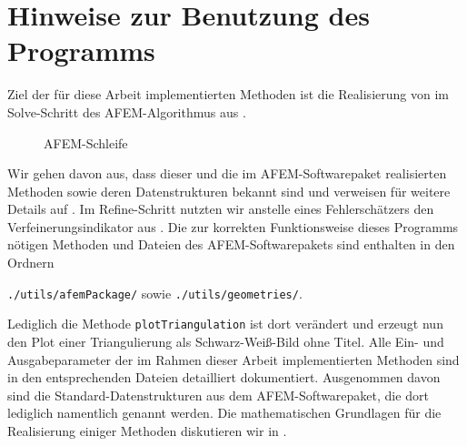 \section{Hinweise zur Benutzung des Programms}
Ziel der für diese Arbeit implementierten Methoden ist die Realisierung von
 im Solve-Schritt des AFEM-Algorithmus aus
. 
\begin{figure}
  \centering
  
  \caption{AFEM-Schleife}
  \label{fig:afemLoop}
\end{figure}
Wir gehen davon aus, dass dieser und die im
AFEM-Softwarepaket realisierten Methoden sowie deren Datenstrukturen bekannt
sind und verweisen für weitere Details auf \cite{CGKNRR10}. 
Im Refine-Schritt nutzten wir anstelle eines Fehlerschätzers den
Verfeinerungsindikator aus .
Die zur korrekten Funktionsweise dieses Programms nötigen Methoden und
Dateien des AFEM-Softwarepakets sind enthalten in den Ordnern
\begin{center}
    \texttt{./utils/afemPackage/} sowie \texttt{./utils/geometries/}.
\end{center}
Lediglich die Methode \texttt{plotTriangulation} ist dort verändert und erzeugt
nun den Plot einer Triangulierung als Schwarz-Weiß-Bild ohne Titel.
Alle Ein- und Ausgabeparameter der im Rahmen dieser Arbeit implementierten
Methoden sind in den entsprechenden Dateien detailliert dokumentiert. 
Ausgenommen davon sind die Standard-Datenstrukturen aus dem AFEM-Softwarepaket,
die dort lediglich namentlich genannt werden.
Die mathematischen Grundlagen für die Realisierung einiger Methoden diskutieren
wir in .

